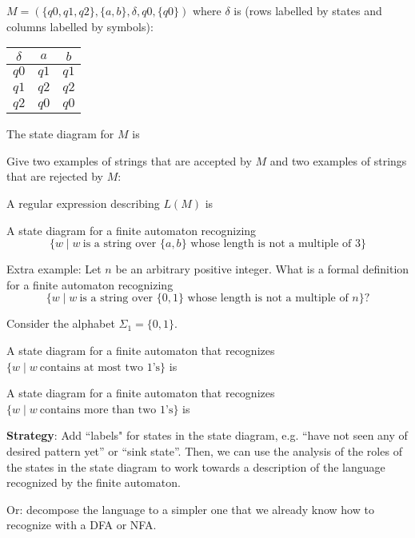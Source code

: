 \documentclass[12pt, oneside]{article}
\begin{document}
$M = ( \{ q0, q1, q2\}, \{a,b\}, \delta, q0, \{q0\} )$ 
where $\delta$ is  (rows labelled by states
and columns labelled by symbols):
\begin{center}
\begin{tabular}{c|cc}
$\delta$ & $a$ & $b$ \\
\hline
$q0$ & $q1$ & $q1$ \\
$q1$ & $q2$ & $q2$ \\
$q2$ & $q0$ & $q0$ \\
\end{tabular}
\end{center}

The state diagram for $M$ is 

\vfill


Give two examples of strings that are accepted by $M$ and two examples of strings that are rejected by $M$:

\vfill


A regular expression describing $L(M)$ is


\vfill 

A state diagram for a finite automaton recognizing
$$\{w \mid w~\text{is a string over $\{a,b\}$ whose length is not a multiple of $3$} \}$$

\vfill

Extra example: Let $n$ be an arbitrary positive integer. What is a formal definition for a finite automaton recognizing
\[
\{w \mid w~\text{is a string over $\{0,1\}$ whose length is not a multiple of $n$} \}?
\]

\newpage

Consider the alphabet $\Sigma_1 = \{0,1\}$.

A state diagram for a finite automaton that recognizes $\{w \mid w~\text{contains at most two $1$'s} \}$ is

\vspace{70pt}

A state diagram for a finite automaton that recognizes $\{w \mid w~\text{contains more than two $1$'s} \}$ is

\vspace{70pt}


\textbf{Strategy}: Add ``labels" for states in the state diagram, 
e.g. ``have not seen any of desired pattern yet'' or
``sink state''. Then, we can use the analysis of the roles of the states in the 
state diagram to work towards a description of the language recognized
by the finite automaton.


Or: decompose the language to a simpler one 
that we already know how to recognize with a DFA or NFA.
\end{document}
